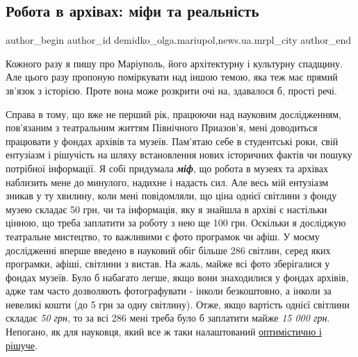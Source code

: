  
 
 
 
 
 
\subsection{Робота в архівах: міфи та реальність}
\label{sec:18_07_2018.stz.news.ua.mrpl_city.1.robota_v_arhivah_mify_ta_realnist}
 
\ifcmt
 author_begin
   author_id demidko_olga.mariupol,news.ua.mrpl_city
 author_end
\fi


Кожного разу я пишу про Маріуполь, його архітектурну і культурну спадщину. Але
цього разу пропоную поміркувати над іншою темою, яка теж має прямий зв'язок з
історією. Проте вона може розкрити очі на, здавалося б, прості речі.

Справа в тому, що вже не перший рік, працюючи над науковим дослідженням,
пов'язаним з театральним життям Північного Приазов'я, мені доводиться працювати
у фондах архівів та музеїв. Пам'ятаю себе в студентські роки, свій ентузіазм і
рішучість на шляху встановлення нових історичних фактів чи пошуку потрібної
інформації. Я собі придумала \textbf{\em міф}, що робота в музеях та архівах наблизить мене
до минулого, надихне і надасть сил. Але весь мій ентузіазм зникав у ту хвилину,
коли мені повідомляли, що ціна однієї світлини з фонду музею складає 50 грн, чи
та інформація, яку я знайшла в архіві є настільки цінною, що треба заплатити за
роботу з нею ще 100 грн. Оскільки я досліджую театральне мистецтво, то
важливими є фото програмок чи афіш. У моєму дослідженні вперше введено в
науковий обіг більше 286 світлин, серед яких програмки, афіші, світлини з
вистав. На жаль, майже всі фото зберігалися у фондах музеїв. Було б набагато
легше, якщо вони знаходилися у фондах архівів, адже там часто дозволяють
фотографувати - інколи безкоштовно, а інколи за невеликі кошти (до 5 грн за
одну світлину). Отже, якщо вартість однієї світлини складає \emph{50 грн}, то за всі
286 мені треба було б заплатити майже \emph{15 000 грн}. Непогано, як для науковця,
який все ж таки налаштований \underline{оптимістично і рішуче}.

